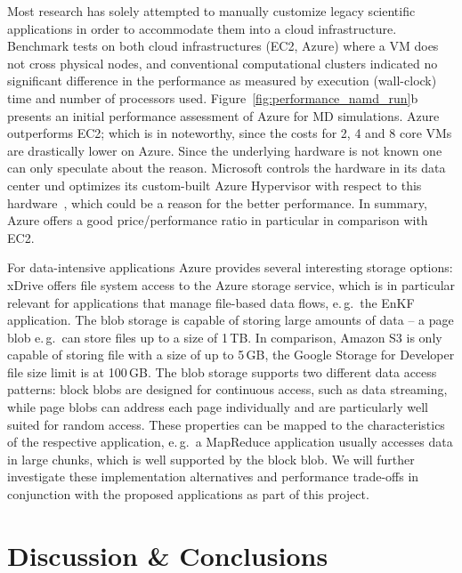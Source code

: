 \documentclass[3p,twocolumn]{elsarticle}
\begin{document}
Most research has solely attempted to manually customize legacy
scientific applications in order to accommodate them into a cloud
infrastructure. Benchmark tests on both cloud infrastructures (EC2,
Azure) where a VM does not cross physical nodes, and conventional
computational clusters indicated no significant difference in the
performance as measured by execution (wall-clock) time and number of
processors used. Figure~\ref{fig:performance_namd_run}b presents an
initial performance assessment of Azure for MD simulations. Azure
outperforms
EC2; %
which is in noteworthy, since the costs for 2, 4 and 8 core VMs are
drastically lower on Azure. Since the underlying hardware is not known
one can only speculate about the reason. Microsoft controls the
hardware in its data center und optimizes its custom-built Azure
Hypervisor with respect to this hardware~\cite{Krishnan:2010nx}, which
could be a reason for the better performance. In summary, Azure offers
a good price/performance ratio in particular in comparison with EC2.


For data-intensive applications Azure provides several interesting
storage options: xDrive offers file system access to the Azure storage
service, which is in particular relevant for applications that manage
file-based data flows, e.\,g.\ the EnKF application. The blob storage
is capable of storing large amounts of data -- a page blob e.\,g.\ can
store files up to a size of 1\,TB.  In comparison, Amazon S3 is only
capable of storing file with a size of up to 5\,GB, the Google Storage
for Developer file size limit is at 100\,GB. The blob storage supports
two different data access patterns: block blobs are designed for
continuous access, such as data streaming, while page blobs can
address each page individually and are particularly well suited for
random access. These properties can be mapped to the characteristics
of the respective application, e.\,g.\ a MapReduce application usually
accesses data in large chunks, which is well supported by the block
blob. We will further investigate these implementation alternatives
and performance trade-offs in conjunction with the proposed
applications as part of this project.


\section{Discussion \& Conclusions}
\label{sec:discuss}
\end{document}
